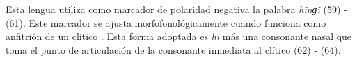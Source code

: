 Esta lengua utiliza como marcador de polaridad negativa la palabra {\setmainfont{Charis SIL} \textit{hinɡi}} (59) - (61). Este marcador se ajusta morfofonológicamente cuando funciona como anfitrión de un clitico \textcolor{MidnightBlue}{\citep{Otomi}}. Esta forma adoptada es {\setmainfont{Charis SIL} \textit{hi}} más una consonante nasal que toma el punto de articulación de la consonante inmediata al clítico (62) - (64).
